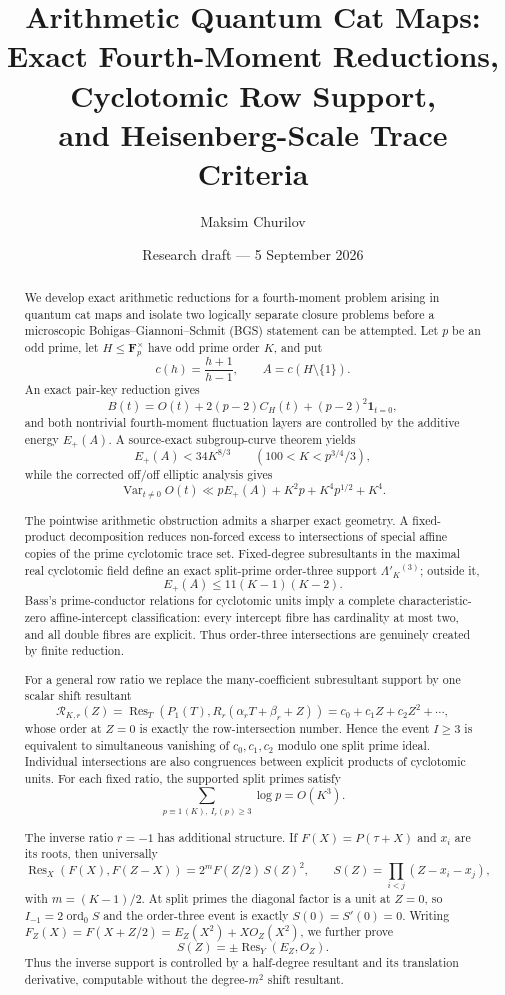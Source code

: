 \documentclass[11pt]{article}
\title{\textbf{Arithmetic Quantum Cat Maps:}\\
Exact Fourth-Moment Reductions, Cyclotomic Row Support,\\
and Heisenberg-Scale Trace Criteria}
\author{Maksim Churilov}
\date{Research draft --- 5 September 2026}
\newcommand{\Res}{\operatorname{Res}}
\newcommand{\Var}{\operatorname{Var}}
\newcommand{\ord}{\operatorname{ord}}
\begin{document}
\maketitle

\begin{abstract}
We develop exact arithmetic reductions for a fourth-moment problem arising in
quantum cat maps and isolate two logically separate closure problems before a
microscopic Bohigas--Giannoni--Schmit (BGS) statement can be attempted.  Let
$p$ be an odd prime, let $H\le\mathbf F_p^\times$ have odd prime order $K$, and
put
\[
c(h)=\frac{h+1}{h-1},\qquad A=c(H\setminus\{1\}).
\]
An exact pair-key reduction gives
\[
B(t)=O(t)+2(p-2)C_H(t)+(p-2)^2\mathbf 1_{t=0},
\]
and both nontrivial fourth-moment fluctuation layers are controlled by the
additive energy $E_+(A)$.  A source-exact subgroup-curve theorem yields
\[
E_+(A)<34K^{8/3}\qquad(100<K<p^{3/4}/3),
\]
while the corrected off/off elliptic analysis gives
\[
\Var_{t\ne0}O(t)\ll pE_+(A)+K^2p+K^4p^{1/2}+K^4.
\]

The pointwise arithmetic obstruction admits a sharper exact geometry.  A
fixed-product decomposition reduces non-forced excess to intersections of
special affine copies of the prime cyclotomic trace set.  Fixed-degree
subresultants in the maximal real cyclotomic field define an exact split-prime
order-three support $\Lambda'_K{}^{(3)}$; outside it,
\[
E_+(A)\le 11(K-1)(K-2).
\]
Bass's prime-conductor relations for cyclotomic units imply a complete
characteristic-zero affine-intercept classification: every intercept fibre has
cardinality at most two, and all double fibres are explicit.  Thus order-three
intersections are genuinely created by finite reduction.

For a general row ratio we replace the many-coefficient subresultant support by
one scalar shift resultant
\[
\mathcal R_{K,r}(Z)
 =\Res_T\!\left(P_1(T),R_r(\alpha_rT+\beta_r+Z)\right)
 =c_0+c_1Z+c_2Z^2+\cdots,
\]
whose order at $Z=0$ is exactly the row-intersection number.  Hence the event
$I\ge3$ is equivalent to simultaneous vanishing of $c_0,c_1,c_2$ modulo one
split prime ideal.  Individual intersections are also congruences between
explicit products of cyclotomic units.  For each fixed ratio, the supported
split primes satisfy
\[
\sum_{p\equiv1\,(K),\ I_r(p)\ge3}\log p=O(K^3).
\]

The inverse ratio $r=-1$ has additional structure.  If
$F(X)=P(\tau+X)$ and $x_i$ are its roots, then universally
\[
\Res_X(F(X),F(Z-X))
 =2^mF(Z/2)\,S(Z)^2,
\qquad
S(Z)=\prod_{i<j}(Z-x_i-x_j),
\]
with $m=(K-1)/2$.  At split primes the diagonal factor is a unit at $Z=0$, so
$I_{-1}=2\ord_0S$ and the order-three event is exactly
$S(0)=S'(0)=0$.  Writing
$F_Z(X)=F(X+Z/2)=E_Z(X^2)+XO_Z(X^2)$, we further prove
\[
S(Z)=\pm\Res_Y(E_Z,O_Z).
\]
Thus the inverse support is controlled by a half-degree resultant and its
translation derivative, computable without the degree-$m^2$ shift resultant.


\end{abstract}
\end{document}
